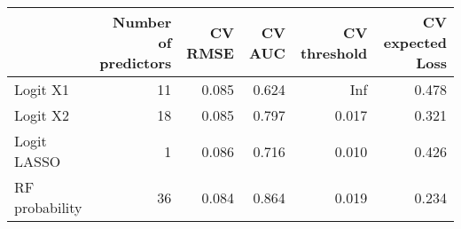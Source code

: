 
\begin{tabular}{lrrrrr}
\toprule
  & Number of predictors & CV RMSE & CV AUC & CV threshold & CV expected Loss\\
\midrule
Logit X1 & 11 & 0.085 & 0.624 & Inf & 0.478\\
Logit X2 & 18 & 0.085 & 0.797 & 0.017 & 0.321\\
Logit LASSO & 1 & 0.086 & 0.716 & 0.010 & 0.426\\
RF probability & 36 & 0.084 & 0.864 & 0.019 & 0.234\\
\bottomrule
\end{tabular}